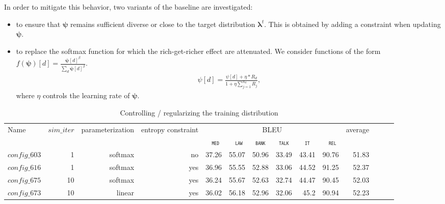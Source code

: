 \documentclass[11pt,a4paper]{article}
\newcommand{\domain}[1]{\texttt{\textsc{#1}}}
\newcommand{\system}[1]{\texttt{{#1}}}
\newcommand{\vlambda}{\ensuremath{\boldsymbol\lambda}\xspace} %
\newcommand{\vpsi}{\ensuremath{\boldsymbol\psi}\xspace} %
\begin{document}
In order to mitigate this behavior, two variants of the baseline are investigated:
\begin{itemize}
\item to ensure that $\vpsi$ remains sufficient diverse or close to the target distribution $\vlambda^t$. This is obtained by adding a constraint when updating $\vpsi$. 
\item to replace the softmax function for which the rich-get-richer effect are attenuated. We consider functions of the form $f(\vpsi)[d] = \frac{\vpsi[d]^\beta}{\sum_d \vpsi[d]^\beta}$.
\begin{align*}
\psi[d] = \frac{\psi[d] + \eta * R_d}{ 1 + \eta \displaystyle{\mathop{\sum}_{j=1}^{n_d}} R_j},
\end{align*}
where $\eta$ controls the learning rate of $\vpsi$.
\end{itemize}

\begin{table}
  \centering %
  \begin{adjustbox}{width=1.0\textwidth,center}
  \begin{tabular}{|p{2.0cm}|*{13}{r|}} \hline
    \multirow{2}{*}{Name} & \multirow{2}{*}{$sim\_iter$} & \multirow{2}{*}{parameterization} & \multirow{2}{*}{entropy constraint} & \multicolumn{6}{|c|}{BLEU} & \multirow{2}{*}{average} \\ \cline{5-10}	
   & & & & \multicolumn{1}{c|}{\domain{ med}} & \multicolumn{1}{c|}{\domain{ law}} & \multicolumn{1}{c|}{\domain{bank}} & \multicolumn{1}{c|}{\domain{talk}} & \multicolumn{1}{c|}{\domain{ it }} & \multicolumn{1}{c|}{\domain{ rel}} &  \\
    \hline
    \system{$config\_603$} & 1 & softmax & no & 37.26& 55.07& 50.96& 33.49& 43.41& 90.76& 51.83\\
    \system{$config\_616$} & 1 & softmax & yes & 36.96& 55.55& 52.88& 33.06& 44.52& 91.25& 52.37 \\
    \system{$config\_675$} & 10 & softmax & yes & 36.24& 55.67& 52.63& 32.74& 44.47& 90.45& 52.03\\
    \system{$config\_673$} & 10 & linear & yes & 36.02& 56.18& 52.96& 32.06& 45.2 & 90.94 & 52.23 \\
  \hline
  \end{tabular}
  \end{adjustbox}
  \caption{Controlling / regularizing the training distribution}
  \label{tab:performance}
\end{table}
\end{document}
